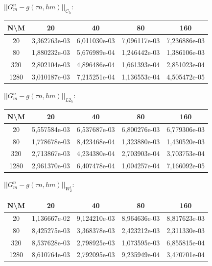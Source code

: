 \documentclass[a4paper, 11pt]{article}
\begin{document}
$||G_m^n - g (\tau n, hm)||_{C_h}$:
\begin{center}
\begin{tabular}{|c|c|c|c|c|}
\hline 
 N\textbackslash M &      20      &      40      &      80      &     160      \\ 
 \hline 
        20         & 3,362763e-03 & 6,011030e-03 & 7,096117e-03 & 7,236886e-03 \\ 
 \hline 
        80         & 1,880232e-03 & 5,676989e-04 & 1,246442e-03 & 1,386106e-03 \\ 
 \hline 
        320        & 2,802104e-03 & 4,896486e-04 & 1,661393e-04 & 2,851023e-04 \\ 
 \hline 
       1280        & 3,010187e-03 & 7,215251e-04 & 1,136553e-04 & 4,505472e-05 \\ 
 \hline 
\end{tabular}
\end{center}
$||G_m^n - g (\tau n, hm)||_{L2_h}$:
\begin{center}
\begin{tabular}{|c|c|c|c|c|}
\hline 
 N\textbackslash M &      20      &      40      &      80      &     160      \\ 
 \hline 
        20         & 5,557584e-03 & 6,537687e-03 & 6,800276e-03 & 6,779306e-03 \\ 
 \hline 
        80         & 1,778678e-03 & 8,423468e-04 & 1,323880e-03 & 1,430520e-03 \\ 
 \hline 
        320        & 2,713867e-03 & 4,234380e-04 & 2,703903e-04 & 3,703753e-04 \\ 
 \hline 
       1280        & 2,961370e-03 & 6,407478e-04 & 1,004257e-04 & 7,166092e-05 \\ 
 \hline 
\end{tabular}
\end{center}
$||G_m^n - g (\tau n, hm)||_{W_2^1}$:
\begin{center}
\begin{tabular}{|c|c|c|c|c|}
\hline 
 N\textbackslash M &      20      &      40      &      80      &     160      \\ 
 \hline 
        20         & 1,136667e-02 & 9,124210e-03 & 8,964636e-03 & 8,817623e-03 \\ 
 \hline 
        80         & 8,425275e-03 & 3,368378e-03 & 2,423212e-03 & 2,311330e-03 \\ 
 \hline 
        320        & 8,537628e-03 & 2,798925e-03 & 1,073595e-03 & 6,855815e-04 \\ 
 \hline 
       1280        & 8,610764e-03 & 2,792095e-03 & 9,235949e-04 & 3,470701e-04 \\ 
 \hline 
\end{tabular}
\end{center}
\end{document}
